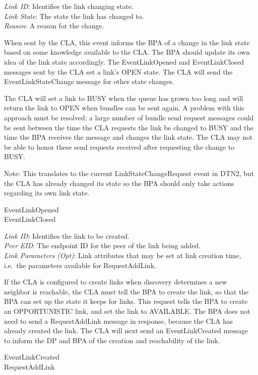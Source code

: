 {
\metP
    {\em Link ID}: Identifies the link changing state.\\
    {\em Link State}: The state the link has changed to.\\
    {\em Reason}: A reason for the change.

\metD
    When sent by the CLA, this event informs the BPA of a change in the link
    state based on some knowledge available to the CLA. The BPA should
    update its own idea of the link state accordingly. The EventLinkOpened and
    EventLinkClosed messages sent by the CLA set a link's OPEN state. The CLA
    will send the EventLinkStateChange message for other state changes.

    The CLA will set a link to BUSY when the queue has grown too long and will
    return the link to OPEN when bundles can be sent again. A problem with
    this approach must be resolved: a large number of bundle send request
    messages could be sent between the time the CLA requests the link be
    changed to BUSY and the time the BPA receives the message and changes
    the link state. The CLA may not be able to honor these send requests
    received after requesting the change to BUSY.

    Note: This translates to the current LinkStateChangeRequest event in DTN2,
    but the CLA has already changed its state so the BPA should only take
    actions regarding its own link state.

\metR
    EventLinkOpened\\
    EventLinkClosed
}

{
\metP
    {\em Link ID}: Identifies the link to be created.\\
    {\em Peer EID}: The endpoint ID for the peer of the link being added.\\
    {\em Link Parameters (Opt)}: Link attributes that may be set at link
    creation time, i.e.\ the parameters available for RequestAddLink.

\metD
    If the CLA is configured to create links when discovery determines a new
    neighbor is reachable, the CLA must tell the BPA to create the link, so
    that the BPA can set up the state it keeps for links. This request tells
    the BPA to create an OPPORTUNISTIC link, and set the link to AVAILABLE.
    The BPA does not need to send a RequestAddLink message in response, because
    the CLA has already created the link. The CLA will next send an
    EventLinkCreated message to inform the DP and BPA of the creation and
    reachability of the link.

\metR
    EventLinkCreated\\
    RequestAddLink
}

